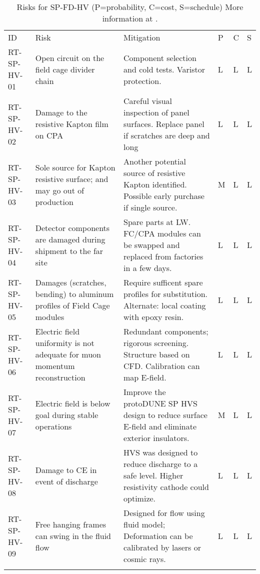 
\begin{footnotesize}
\begin{longtable}{P{0.18\textwidth}P{0.20\textwidth}P{0.32\textwidth}P{0.02\textwidth}P{0.02\textwidth}P{0.02\textwidth}} 
\caption[Risks for SP-FD-HV]{Risks for SP-FD-HV (P=probability, C=cost, S=schedule) More information at . } \\
ID & Risk & Mitigation & P & C & S  \\  \colhline
RT-SP-HV-01 & Open circuit on the field cage divider chain & Component selection and cold tests. Varistor protection. & L & L & L \\  \colhline
RT-SP-HV-02 & Damage to the resistive Kapton film on CPA & Careful visual inspection of panel surfaces.  Replace panel if scratches are deep and long  & L & L & L \\  \colhline
RT-SP-HV-03 & Sole source for Kapton resistive surface; and may go out of production & Another potential source of resistive Kapton identified. Possible early purchase if single source. & M & L & L \\  \colhline
RT-SP-HV-04 & Detector components are damaged during shipment to the far site  & Spare parts at  LW. FC/CPA modules can be swapped and replaced from factories in a few days. & L & L & L \\  \colhline
RT-SP-HV-05 & Damages (scratches, bending) to aluminum profiles of Field Cage modules & Require sufficent spare profiles for substitution. Alternate: local coating with epoxy resin. & L & L & L \\  \colhline
RT-SP-HV-06 & Electric field uniformity is not adequate for muon momentum reconstruction  & Redundant components; rigorous screening. Structure based on CFD. Calibration can map E-field. & L & L & L \\  \colhline
RT-SP-HV-07 & Electric field is below goal during stable operations & Improve the protoDUNE SP HVS design to reduce surface E-field and eliminate exterior insulators. & M & L & L \\  \colhline
RT-SP-HV-08 & Damage to CE in event of discharge  & HVS was designed to reduce discharge to a safe level. Higher resistivity cathode could optimize. & L & L & L \\  \colhline
RT-SP-HV-09 & Free hanging frames can swing in the fluid flow  & Designed for flow using fluid model; Deformation can be calibrated by lasers or cosmic rays. & L & L & L \\  \colhline

\end{longtable}
\end{footnotesize}
